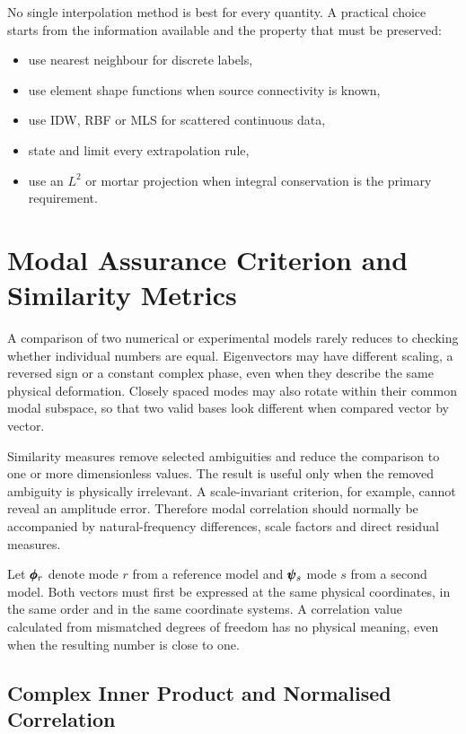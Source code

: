 No single interpolation method is best for every quantity. A practical choice
starts from the information available and the property that must be preserved:

\begin{itemize}
    \item use nearest neighbour for discrete labels,
    \item use element shape functions when source connectivity is known,
    \item use IDW, RBF or MLS for scattered continuous data,
    \item state and limit every extrapolation rule,
    \item use an $ L^2 $ or mortar projection when integral conservation is the
          primary requirement.
\end{itemize}

\section{Modal Assurance Criterion and Similarity Metrics}

A comparison of two numerical or experimental models rarely reduces to checking
whether individual numbers are equal. Eigenvectors may have different scaling,
a reversed sign or a constant complex phase, even when they describe the same
physical deformation. Closely spaced modes may also rotate within their common
modal subspace, so that two valid bases look different when compared vector by
vector.

Similarity measures remove selected ambiguities and reduce the comparison to
one or more dimensionless values. The result is useful only when the removed
ambiguity is physically irrelevant. A scale-invariant criterion, for example,
cannot reveal an amplitude error. Therefore modal correlation should normally
be accompanied by natural-frequency differences, scale factors and direct
residual measures.

Let $ \pmb{\phi}_r $ denote mode $ r $ from a reference model and
$ \pmb{\psi}_s $ mode $ s $ from a second model. Both vectors must first be
expressed at the same physical coordinates, in the same order and in the same
coordinate systems. A correlation value calculated from mismatched degrees of
freedom has no physical meaning, even when the resulting number is close to one.

\subsection{Complex Inner Product and Normalised Correlation}

